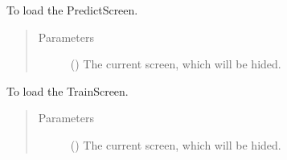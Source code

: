\documentclass[letterpaper,10pt,english]{sphinxmanual}
\begin{document}
\begin{fulllineitems}
\begin{fulllineitems}
\end{fulllineitems}


\begin{fulllineitems}
\label{\detokenize{anoog.automation:anoog.automation.graphical_user_interface.GUI_App.load_screen_predict}}
\sphinxAtStartPar
To load the Predict\sphinxhyphen{}Screen.
\begin{quote}\begin{description}
\item[{Parameters}] \leavevmode
\sphinxAtStartPar
{} () \textendash{} The current screen, which will be hided.

\end{description}\end{quote}

\end{fulllineitems}


\begin{fulllineitems}
\label{\detokenize{anoog.automation:anoog.automation.graphical_user_interface.GUI_App.load_screen_train}}
\sphinxAtStartPar
To load the Train\sphinxhyphen{}Screen.
\begin{quote}\begin{description}
\item[{Parameters}] \leavevmode
\sphinxAtStartPar
{} () \textendash{} The current screen, which will be hided.

\end{description}\end{quote}


\end{fulllineitems}
\end{fulllineitems}
\end{document}
